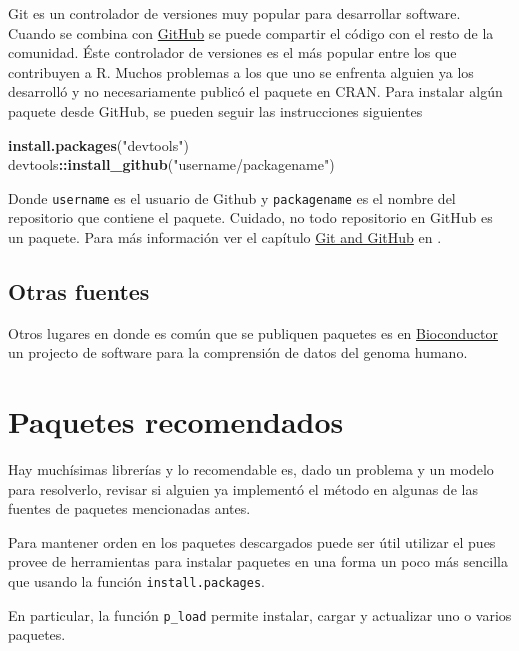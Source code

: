 \documentclass[]{article}
\newenvironment{Shaded}{\begin{snugshade}}{\end{snugshade}}
\newcommand{\KeywordTok}[1]{\textcolor[rgb]{0.13,0.29,0.53}{\textbf{#1}}}
\newcommand{\StringTok}[1]{\textcolor[rgb]{0.31,0.60,0.02}{#1}}
\newcommand{\OperatorTok}[1]{\textcolor[rgb]{0.81,0.36,0.00}{\textbf{#1}}}
\newcommand{\NormalTok}[1]{#1}
\begin{document}
Git es un controlador de versiones muy popular para desarrollar
software. Cuando se combina con \href{https://github.com/}{GitHub} se
puede compartir el código con el resto de la comunidad. Éste controlador
de versiones es el más popular entre los que contribuyen a R. Muchos
problemas a los que uno se enfrenta alguien ya los desarrolló y no
necesariamente publicó el paquete en CRAN. Para instalar algún paquete
desde GitHub, se pueden seguir las instrucciones siguientes

\begin{Shaded}
\begin{Highlighting}[]
\KeywordTok{install.packages}\NormalTok{(}\StringTok{"devtools"}\NormalTok{)}
\NormalTok{devtools}\OperatorTok{::}\KeywordTok{install_github}\NormalTok{(}\StringTok{"username/packagename"}\NormalTok{)}
\end{Highlighting}
\end{Shaded}

Donde \texttt{username} es el usuario de Github y \texttt{packagename}
es el nombre del repositorio que contiene el paquete. Cuidado, no todo
repositorio en GitHub es un paquete. Para más información ver el
capítulo \href{http://r-pkgs.had.co.nz/git.html}{Git and GitHub} en
\textcite{wickham2015r}.

\subsection{Otras fuentes}\label{otras-fuentes}

Otros lugares en donde es común que se publiquen paquetes es en
\href{https://www.bioconductor.org/}{Bioconductor} un projecto de
software para la comprensión de datos del genoma humano.

\section{Paquetes recomendados}\label{paquetes-recomendados}

Hay muchísimas librerías y lo recomendable es, dado un problema y un
modelo para resolverlo, revisar si alguien ya implementó el método en
algunas de las fuentes de paquetes mencionadas antes.

Para mantener orden en los paquetes descargados puede ser útil utilizar
el \textcite{pacman} pues provee de herramientas para instalar paquetes
en una forma un poco más sencilla que usando la función
\texttt{install.packages}.

En particular, la función \texttt{p\_load} permite instalar, cargar y
actualizar uno o varios paquetes.
\end{document}
